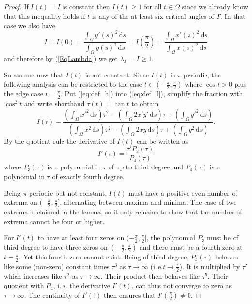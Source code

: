 \documentclass{article}
\newcommand{\ite}{i.\,e.\xspace}
\newcommand{\ds}{\,\mathrm{d}s}
\begin{document}
\begin{proof}
    If $I(t) = I$ is constant then $I(t) \ge 1$ for all $t\in\Omega$ since we already know that this inequality holds if $t$ is any of the at least six critical angles of $\Gamma$. In that case we also have
    \[I = I(0) = \frac{\int_\Omega y'(s)^2\ds}{\int_\Omega y(s)^2\ds} = I(\frac{\pi}{2}) = \frac{\int_\Omega x'(s)^2\ds}{\int_\Omega x(s)^2\ds}\]
    and therefore by (\ref{EqLambda}) we get  $\lambda_\Gamma = I \ge 1$.
    
    So assume now that $I(t)$ is not constant. Since $I(t)$ is $\pi$-periodic, the following analysis can be restricted to the case $t \in (-\frac\pi2,\frac\pi2)$ where $\cos t>0$ plus the edge case $t = \frac\pi2$.
    Put (\ref{eq:def_h}) into (\ref{eq:def_I}), simplify the fraction with $\cos^2 t$ and write shorthand $\tau(t) = \tan t$ to obtain
    \begin{equation*}
         I(t) = \frac{(\int_\Omega x'^2\ds) \tau^2 -(\int_\Omega 2x'y' \ds) \tau +(\int_\Omega y'^2 \ds)}{(\int_\Omega x^2\ds) \tau^2 -(\int_\Omega 2xy \ds) \tau +(\int_\Omega y^2 \ds)}.
    \end{equation*}
    By the quotient rule the derivative of $I(t)$ can be written as
    \[I'(t) = \frac{\tau' P_3(\tau)}{P_4(\tau)}\]
    where $P_3(\tau)$ is a polynomial in $\tau$ of up to third degree and $P_4(\tau)$ is a polynomial in $\tau$ of exactly fourth degree.

    Being $\pi$-periodic but not constant, $I(t)$ must have a positive even number of extrema on $(-\frac\pi 2,\frac\pi 2]$, alternating between maxima and minima.
    The case of two extrema is claimed in the lemma, so it only remains to show that the number of extrema cannot be four or higher.

    For $I'(t)$ to have at least four zeros on $(-\frac\pi 2,\frac\pi 2]$, the polynomial $P_3$ must be of third degree to have three zeros on $(-\frac\pi 2,\frac\pi 2)$ and there must be a fourth zero at $t = \frac\pi 2$. Yet this fourth zero cannot exist: Being of third degree, $P_3(\tau)$ behaves like some (non-zero) constant times $\tau^3$ as $\tau \rightarrow \infty$ (\ite $t \rightarrow \frac\pi 2$). It is multiplied by $\tau'$ which increases like $\tau^2$ as $\tau \rightarrow \infty$. Their product then behaves like $\tau^5$. Their quotient with $P_4$, \ite the derivative $I'(t)$, can thus not converge to zero as $\tau\rightarrow\infty$. The continuity of $I'(t)$ then ensures that $I'(\frac\pi 2) \neq 0$.
\end{proof}
\end{document}
